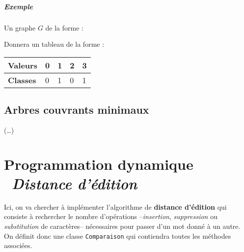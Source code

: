 \documentclass[12pt, a4paper]{report}
\begin{document}
{    \paragraph{Exemple}

    Un graphe $G$ de la forme :

    \begin{figure}[h]
        \centering
    \end{figure}

    Donnera un tableau de la forme :

    \begin{table}[h]
    \centering
    \label{my-label}
    \begin{tabular}{|l|l|l|l|l|}
    \hline
    \textbf{Valeurs} & 0 & 1 & 2 & 3 \\ \hline
    \textbf{Classes} & 0 & 1 & 0 & 1 \\ \hline
    \end{tabular}
    \end{table}

    \section{Arbres couvrants minimaux}

    (\dots)

\chapter[Programmation dynamique. Distance d'édition]{Programmation dynamique {\ \normalfont\emph{Distance d'édition}}}

    Ici, on va chercher à implémenter l'algorithme de \textbf{distance d'édition} qui consiste à rechercher le nombre d'opérations --\emph{insertion}, \emph{suppression} ou \emph{substitution} de caractères-- nécessaires pour passer d'un mot donné à un autre. On définit donc une classe \texttt{Comparaison} qui contiendra toutes les méthodes associées.

}
\end{document}
